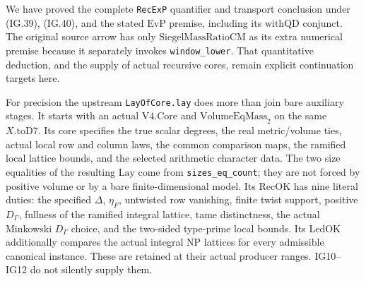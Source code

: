We have proved the complete \texttt{RecExP} quantifier and
transport conclusion under (IG.39), (IG.40), and the stated
$\mathrm{EvP}$ premise, including its $\mathrm{withQD}$
conjunct. The original source arrow has only
$\mathrm{SiegelMassRatioCM}$ as its extra numerical premise
because it separately invokes \texttt{window\_lower}.
That quantitative deduction, and the supply of actual
recursive cores, remain explicit continuation targets here.

For precision the upstream \texttt{LayOfCore.lay} does more
than join bare auxiliary stages. It starts with an actual
$\mathrm{V4.Core}$ and $\mathrm{VolumeEqMass}_2$ on the same
$X.\mathrm{toD7}$. Its core specifies the true scalar
degrees, the real metric/volume ties, actual local row and
column laws, the common comparison maps, the ramified local
lattice bounds, and the selected arithmetic character data.
The two size equalities of the resulting $\mathrm{Lay}$
come from \texttt{sizes\_eq\_count}; they are not forced by
positive volume or by a bare finite-dimensional model.
Its $\mathrm{RecOK}$ has nine literal duties: the specified
$\Delta$, $\eta_F$, untwisted row vanishing, finite twist
support, positive $D_\Gamma$, fullness of the ramified
integral lattice, tame distinctness, the actual Minkowski
$D_\Gamma$ choice, and the two-sided type-prime local bounds.
Its $\mathrm{LedOK}$ additionally compares the
actual integral $\mathrm{NP}$ lattices for every admissible
canonical instance. These are retained at their actual
producer ranges. IG10--IG12 do not silently supply them.
